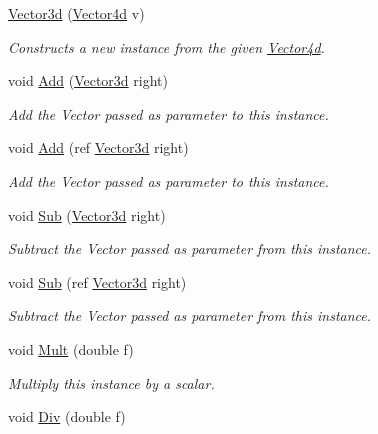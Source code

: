 \begin{DoxyCompactItemize}
\hyperlink{struct_open_t_k_1_1_vector3d_a5177e1a86c590b993afe3abc20aaa3e7}{Vector3d} (\hyperlink{struct_open_t_k_1_1_vector4d}{Vector4d} v)
\begin{DoxyCompactList}\small\item\em Constructs a new instance from the given \hyperlink{struct_open_t_k_1_1_vector4d}{Vector4d}. \end{DoxyCompactList}\item 
void \hyperlink{struct_open_t_k_1_1_vector3d_adc445ad9a941c590dc447c6d2f7ccb34}{Add} (\hyperlink{struct_open_t_k_1_1_vector3d}{Vector3d} right)
\begin{DoxyCompactList}\small\item\em Add the Vector passed as parameter to this instance.\end{DoxyCompactList}\item 
void \hyperlink{struct_open_t_k_1_1_vector3d_ab7fd01601025bd6f0af1db19215bb464}{Add} (ref \hyperlink{struct_open_t_k_1_1_vector3d}{Vector3d} right)
\begin{DoxyCompactList}\small\item\em Add the Vector passed as parameter to this instance.\end{DoxyCompactList}\item 
void \hyperlink{struct_open_t_k_1_1_vector3d_aab98cdc60c3ee632c2c31aa6ff73bc5c}{Sub} (\hyperlink{struct_open_t_k_1_1_vector3d}{Vector3d} right)
\begin{DoxyCompactList}\small\item\em Subtract the Vector passed as parameter from this instance.\end{DoxyCompactList}\item 
void \hyperlink{struct_open_t_k_1_1_vector3d_a692dcef55111b47eb83e35372ecff544}{Sub} (ref \hyperlink{struct_open_t_k_1_1_vector3d}{Vector3d} right)
\begin{DoxyCompactList}\small\item\em Subtract the Vector passed as parameter from this instance.\end{DoxyCompactList}\item 
void \hyperlink{struct_open_t_k_1_1_vector3d_ae290c47012c01c4abbe5c0ec93bcd026}{Mult} (double f)
\begin{DoxyCompactList}\small\item\em Multiply this instance by a scalar.\end{DoxyCompactList}\item 
void \hyperlink{struct_open_t_k_1_1_vector3d_a32b8dae5103dc2eb4dbb02210a003d83}{Div} (double f)

\end{DoxyCompactItemize}
